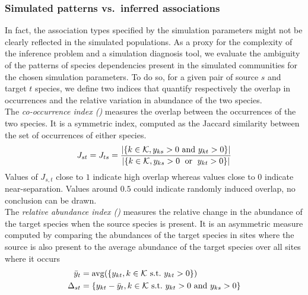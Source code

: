 \documentclass[10pt,a4paper]{article}
\begin{document}
\subsubsection{Simulated patterns vs.\ inferred associations}
In fact, the association types specified by the simulation parameters might not be clearly reflected in the simulated populations. As a proxy for the complexity of the inference problem and a simulation diagnosis tool, we evaluate the ambiguity of the patterns of species dependencies present in the simulated communities for the chosen simulation parameters. To do so, for a given pair of source $s$ and target $t$ species, we define two indices that quantify respectively the overlap in occurrences and the relative variation in abundance of the two species.\\  

The \emph{co-occurrence index (\evJoc)} measures the overlap between the occurrences of the two species.  It is a symmetric index, computed as the Jaccard similarity between the set of occurrences of either species.
\begin{equation*}
J_{st} = J_{ts} = \dfrac{\left\lvert\{k \in \mathcal{K},  y_{k s} > 0 \text{ and } y_{k t} > 0\}\right\rvert}{\left\lvert\{k \in \mathcal{K},  y_{k s} > 0 \text{ \;or\; } y_{k t} > 0\}\right\rvert}
\end{equation*}
Values of $J_{s,t}$ close to $1$ indicate high overlap whereas values close to $0$ indicate near-separation. Values around $0.5$ could indicate randomly induced overlap, no conclusion can be drawn. \\

The \emph{relative abundance index (\evRAI)} measures the relative change in the abundance of the target species when the source species is present. It is an asymmetric measure computed by comparing the abundances of the target species in sites where the source is also present to the average abundance of the target species over all sites where it occurs
\begin{align*}
  \bar{y}_{t} & = \operatorname{avg}(\{ y_{k t},  k \in \mathcal{K}\text{ s.t.\ }y_{k t} > 0\}) \\
  \Delta_{st} & = \{ y_{k t} - \bar{y}_{t},  k \in \mathcal{K}\text{ s.t.\ }y_{k t} > 0 \text{ and } y_{k s} > 0\}
\end{align*}
\end{document}
